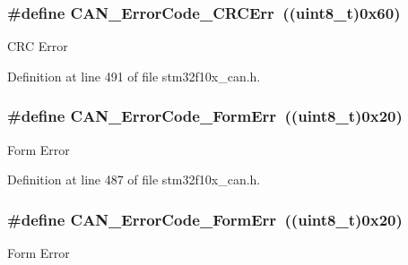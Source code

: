 \subsubsection[{\texorpdfstring{C\+A\+N\+\_\+\+Error\+Code\+\_\+\+C\+R\+C\+Err}{CAN_ErrorCode_CRCErr}}]{\setlength{\rightskip}{0pt plus 5cm}\#define C\+A\+N\+\_\+\+Error\+Code\+\_\+\+C\+R\+C\+Err~(({\bf uint8\+\_\+t})0x60)}\hypertarget{group___c_a_n___error___code__constants_gafa75157442dba7ba1a91036242b78e92}{}\label{group___c_a_n___error___code__constants_gafa75157442dba7ba1a91036242b78e92}
C\+RC Error 

Definition at line 491 of file stm32f10x\+\_\+can.\+h.

\subsubsection[{\texorpdfstring{C\+A\+N\+\_\+\+Error\+Code\+\_\+\+Form\+Err}{CAN_ErrorCode_FormErr}}]{\setlength{\rightskip}{0pt plus 5cm}\#define C\+A\+N\+\_\+\+Error\+Code\+\_\+\+Form\+Err~(({\bf uint8\+\_\+t})0x20)}\hypertarget{group___c_a_n___error___code__constants_ga1fe585558bb8d5c834b4266661392cb2}{}\label{group___c_a_n___error___code__constants_ga1fe585558bb8d5c834b4266661392cb2}
Form Error 

Definition at line 487 of file stm32f10x\+\_\+can.\+h.

\subsubsection[{\texorpdfstring{C\+A\+N\+\_\+\+Error\+Code\+\_\+\+Form\+Err}{CAN_ErrorCode_FormErr}}]{\setlength{\rightskip}{0pt plus 5cm}\#define C\+A\+N\+\_\+\+Error\+Code\+\_\+\+Form\+Err~(({\bf uint8\+\_\+t})0x20)}\hypertarget{group___c_a_n___error___code__constants_ga1fe585558bb8d5c834b4266661392cb2}{}\label{group___c_a_n___error___code__constants_ga1fe585558bb8d5c834b4266661392cb2}
Form Error 

